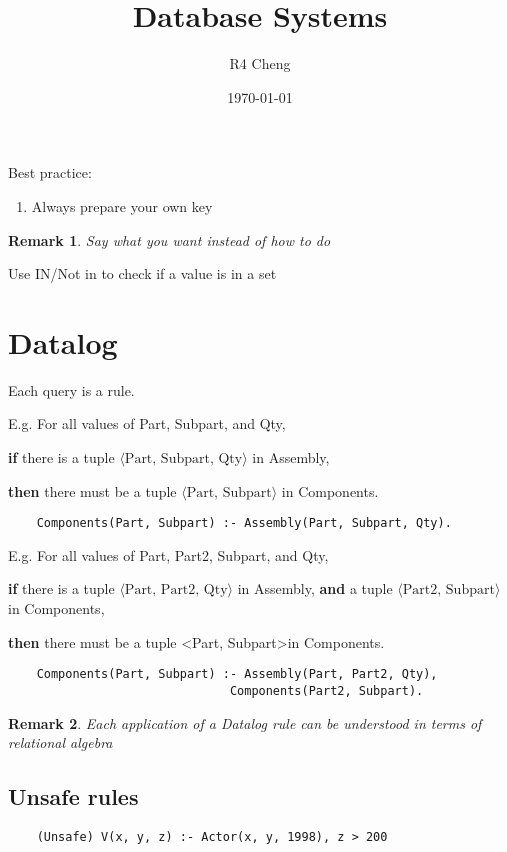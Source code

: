 \documentclass[12pt,a4paper]{article}
\title{Database Systems}
\author{R4 Cheng}
\date{\today}
\newtheorem*{rem}{Remark}
\newcommand{\Remark}[1]{
  \begin{rem}
    \color{cyan}
    #1
  \end{rem}
}
\begin{document}
\maketitle

Best practice:

\begin{enumerate}
    \item Always prepare your own key
\end{enumerate}

\Remark{Say what you want instead of how to do}

Use IN/Not in to check if a value is in a set

\section*{Datalog}

Each query is a rule.

E.g. For all values of Part, Subpart, and Qty,

\textbf{if} there is a tuple \(\langle \text{Part, Subpart, Qty} \rangle\) in Assembly,

\textbf{then} there must be a tuple \(\langle \text{Part, Subpart} \rangle\) in Components.

\begin{verbatim}
    Components(Part, Subpart) :- Assembly(Part, Subpart, Qty).
\end{verbatim}

E.g. For all values of Part, Part2, Subpart, and Qty,

\textbf{if} there is a tuple \(\langle \text{Part, Part2, Qty} \rangle\) in Assembly, 
\textbf{and} a tuple \(\langle \text{Part2, Subpart} \rangle\) in Components,

\textbf{then} there must be a tuple \textless Part, Subpart\textgreater in Components.

\begin{verbatim}
    Components(Part, Subpart) :- Assembly(Part, Part2, Qty), 
                               Components(Part2, Subpart).
\end{verbatim}

\Remark{Each application of a Datalog rule can be understood in terms of relational algebra}

\subsection*{Unsafe rules}

\begin{verbatim}
    (Unsafe) V(x, y, z) :- Actor(x, y, 1998), z > 200
\end{verbatim}
\end{document}
